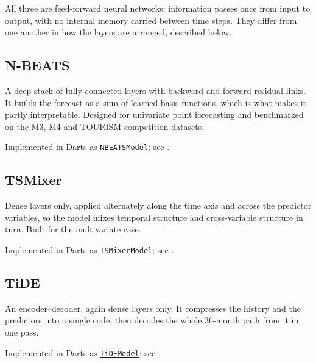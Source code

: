 All three are feed-forward neural networks: information passes once from input to output, with no
internal memory carried between time steps. They differ from one another in how the layers are
arranged, described below.

\subsection*{N-BEATS}

A deep stack of fully connected layers with backward and forward residual links. It builds the
forecast as a sum of learned basis functions, which is what makes it partly interpretable. Designed
for univariate point forecasting and benchmarked on the M3, M4 and TOURISM competition datasets.

\noindent Implemented in Darts as \href{https://unit8co.github.io/darts/generated_api/darts.models.forecasting.nbeats.html}{\texttt{NBEATSModel}};
see \citet{oreshkin2020nbeats}.


\subsection*{TSMixer}

Dense layers only, applied alternately along the time axis and across the predictor variables, so
the model mixes temporal structure and cross-variable structure in turn. Built for the multivariate
case.

\noindent Implemented in Darts as \href{https://unit8co.github.io/darts/generated_api/darts.models.forecasting.tsmixer_model.html}{\texttt{TSMixerModel}};
see \citet{chen2023tsmixer}.


\subsection*{TiDE}

An encoder--decoder, again dense layers only. It compresses the history and the predictors into a
single code, then decodes the whole 36-month path from it in one pass.

\noindent Implemented in Darts as \href{https://unit8co.github.io/darts/generated_api/darts.models.forecasting.tide_model.html}{\texttt{TiDEModel}};
see \citet{das2023tide}.

